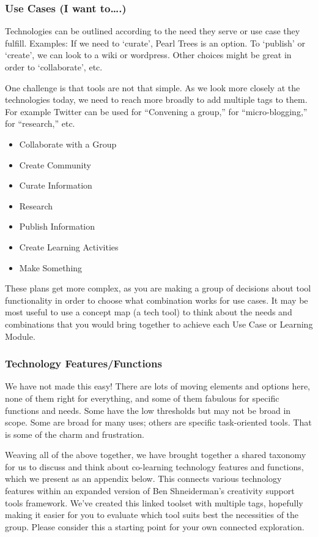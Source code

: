 \subsubsection{Use Cases (I want to\ldots{}.)}

Technologies can be outlined according to the need they serve or use
case they fulfill. Examples: If we need to `curate', Pearl Trees is an
option. To `publish' or `create', we can look to a wiki or wordpress.
Other choices might be great in order to `collaborate', etc.

One challenge is that tools are not that simple. As we look more closely
at the technologies today, we need to reach more broadly to add multiple
tags to them. For example Twitter can be used for ``Convening a group,''
for ``micro-blogging,'' for ``research,'' etc.

\begin{itemize}[noitemsep]
\item
  Collaborate with a Group
\item
  Create Community
\item
  Curate Information
\item
  Research
\item
  Publish Information
\item
  Create Learning Activities
\item
  Make Something
\end{itemize}
These plans get more complex, as you are making a group of decisions
about tool functionality in order to choose what combination works for
use cases. It may be most useful to use a concept map (a tech tool) to
think about the needs and combinations that you would bring together to
achieve each Use Case or Learning Module.

\subsubsection{Technology Features/Functions}

We have not made this easy! There are lots of moving elements and
options here, none of them right for everything, and some of them
fabulous for specific functions and needs. Some have the low thresholds
but may not be broad in scope. Some are broad for many uses; others are
specific task-oriented tools. That is some of the charm and frustration.

Weaving all of the above together, we have brought together a shared
taxonomy for us to discuss and think about co-learning technology
features and functions, which we present as an appendix below. This
connects various technology features within an expanded version of Ben
Shneiderman's creativity support tools framework. We've created this
linked toolset with multiple tags, hopefully making it easier for you to
evaluate which tool suits best the necessities of the group. Please
consider this a starting point for your own connected exploration.

